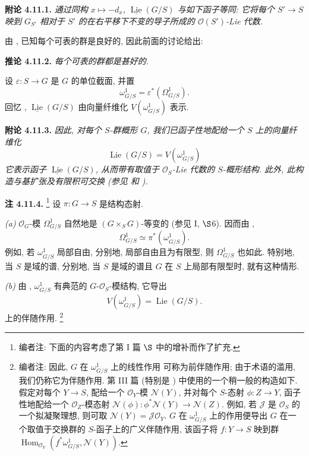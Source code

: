 \medskip
\noindent{}\textbf{附论 4.11.1.}
\textit{通过同构 \(x\mapsto-d_x\),
\(\underline{\operatorname{Lie}}(G/S)\) 与如下函子等同:
它将每个 \(S'\to S\) 映到 \(G_{S'}\) 相对于 \(S'\)
的在右平移下不变的导子所成的 \(\mathcal O(S')\)-Lie 代数.}

由 , 已知每个可表的群是良好的,
因此前面的讨论给出:

\medskip
\noindent{}\textbf{推论 4.11.2.}
\textit{每个可表的群都是甚好的.}

设 \(\varepsilon:S\to G\) 是 \(G\) 的单位截面, 并置
\[
 \omega^1_{G/S}=\varepsilon^*(\Omega^1_{G/S}).
\]
回忆 ,
\(\underline{\operatorname{Lie}}(G/S)\) 由向量纤维化
\(V(\omega^1_{G/S})\) 表示.

\medskip
\noindent{}\textbf{附论 4.11.3.}
\textit{因此, 对每个 \(S\)-群概形 \(G\), 我们已函子性地配给一个
\(S\) 上的向量纤维化}
\[
 \operatorname{Lie}(G/S)=V(\omega^1_{G/S})
\]
\textit{它表示函子 \(\underline{\operatorname{Lie}}(G/S)\),
从而带有取值于 \(\mathcal O_S\)-Lie 代数的 \(S\)-概形结构.
此外, 此构造与基扩张及有限积可交换
(参见  和 ).}

\medskip
\noindent{}\textbf{注 4.11.4.}
\footnote{编者注: 下面的内容考虑了第 I 篇
\(\S\) 中的增补而作了扩充.}
设 \(\pi:G\to S\) 是结构态射.

\textit{(a)} \(\mathcal O_G\)-模 \(\Omega^1_{G/S}\) 自然地是
\((G\times_SG)\)-等变的 (参见 I, \(\S\)6). 因而由
,
\[
 \Omega^1_{G/S}\simeq\pi^*(\omega^1_{G/S}).
\]
例如, 若 \(\omega^1_{G/S}\) 局部自由, 分别地, 局部自由且为有限型,
则 \(\Omega^1_{G/S}\) 也如此. 特别地, 当 \(S\) 是域的谱,
分别地, 当 \(S\) 是域的谱且 \(G\) 在 \(S\) 上局部有限型时,
就有这种情形.

\textit{(b)} 由 ,
\(\omega^1_{G/S}\) 有典范的
\(G\)-\(\mathcal O_S\)-模结构, 它导出
\[
 V(\omega^1_{G/S})=\operatorname{Lie}(G/S).
\]
上的伴随作用.
\footnote{编者注: 因此, \(G\) 在 \(\omega^1_{G/S}\) 上的线性作用
可称为前伴随作用; 由于术语的滥用, 我们仍称它为伴随作用.
第 III 篇 (特别是 )
中使用的一个稍一般的构造如下. 假定对每个 \(Y\to S\), 配给一个
\(\mathcal O_Y\)-模 \(\mathcal N(Y)\),
并对每个 \(S\)-态射 \(\phi:Z\to Y\), 函子性地配给一个
\(\mathcal O_Z\)-模态射
\(\mathcal N(\phi):\phi^*\mathcal N(Y)\to\mathcal N(Z)\).
例如, 若 \(\mathcal J\) 是 \(\mathcal O_S\) 的一个拟凝聚理想,
则可取 \(\mathcal N(Y)=\mathcal J\mathcal O_Y\).
\(G\) 在 \(\omega^1_{G/S}\) 上的作用便导出 \(G\)
在一个取值于交换群的 \(S\)-函子上的广义伴随作用,
该函子将 \(f:Y\to S\) 映到群
\(\operatorname{Hom}_{\mathcal O_Y}
(f^*\omega^1_{G/S},\mathcal N(Y))\).}


